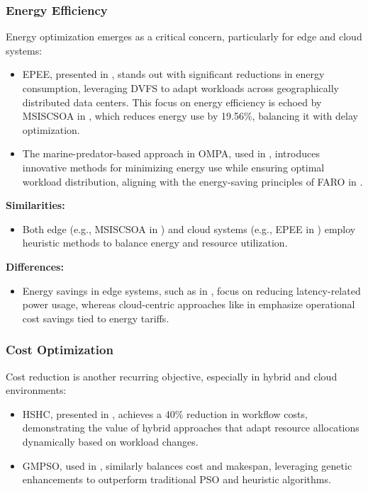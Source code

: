 \documentclass[a4paper, final]{article}
\begin{document}
\subsubsection{Energy Efficiency}
Energy optimization emerges as a critical concern, particularly for edge and cloud systems:
\begin{itemize}
    \item EPEE, presented in \cite{bib:5_epee}, stands out with significant reductions in energy consumption, 
    leveraging DVFS to adapt workloads across geographically distributed data centers. This focus on 
    energy efficiency is echoed by MSISCSOA in \cite{bib:3_sandcat}, which reduces energy use by 19.56\%, balancing it with 
    delay optimization.

    \item The marine-predator-based approach in OMPA, used in \cite{bib:6_marine}, introduces innovative 
    methods for minimizing energy use while ensuring optimal workload distribution, aligning with the 
    energy-saving principles of FARO in \cite{bib:2_faro}.
\end{itemize}

\noindent \textbf{Similarities:}
\begin{itemize}
    \item Both edge (e.g., MSISCSOA in \cite{bib:3_sandcat}) and cloud systems (e.g., EPEE in 
    \cite{bib:5_epee}) employ heuristic methods to balance energy and resource utilization.
\end{itemize}

\noindent \textbf{Differences:}
\begin{itemize}
    \item Energy savings in edge systems, such as in \cite{bib:3_sandcat}, focus on reducing latency-related 
    power usage, whereas cloud-centric approaches like in \cite{bib:5_epee} emphasize operational cost 
    savings tied to energy tariffs.
\end{itemize}

\subsubsection{Cost Optimization}
Cost reduction is another recurring objective, especially in hybrid and cloud environments:
\begin{itemize}
    \item HSHC, presented in \cite{bib:9}, achieves a 40\% reduction in workflow costs, demonstrating the 
    value of hybrid approaches that adapt resource allocations dynamically based on workload changes.

    \item GMPSO, used in \cite{bib:10}, similarly balances cost and makespan, leveraging genetic enhancements 
    to outperform traditional PSO and heuristic algorithms.
\end{itemize}
\end{document}
